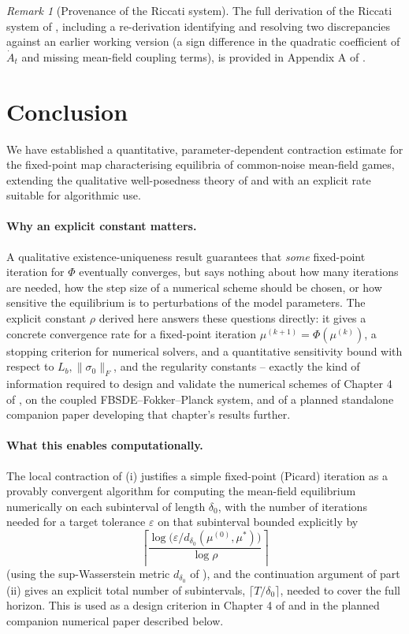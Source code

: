 \documentclass[11pt]{article}
\theoremstyle{remark}
\newtheorem{remark}[theorem]{Remark}
\begin{document}
\begin{remark}[Provenance of the Riccati system]
\label{rem:lq-provenance}
The full derivation of the Riccati system of , including a
re-derivation identifying and resolving two discrepancies against an earlier
working version (a sign difference in the quadratic coefficient of $\dot A_t$ and
missing mean-field coupling terms), is provided in Appendix A of
\citet{monyimba2026thesis}.
\end{remark}

\section{Conclusion}

We have established a quantitative, parameter-dependent contraction estimate for the
fixed-point map characterising equilibria of common-noise mean-field games, extending
the qualitative well-posedness theory of \citet{carmonadelarue2018} and
\citet{ahujarenyang2019} with an explicit rate suitable for algorithmic use.

\paragraph{Why an explicit constant matters.} A qualitative existence-uniqueness
result guarantees that \emph{some} fixed-point iteration for $\Phi$ eventually
converges, but says nothing about how many iterations are needed, how the step size
of a numerical scheme should be chosen, or how sensitive the equilibrium is to
perturbations of the model parameters. The explicit constant $\rho$ derived here
answers these questions directly: it gives a concrete convergence rate for a
fixed-point iteration $\mu^{(k+1)} = \Phi(\mu^{(k)})$, a stopping criterion for
numerical solvers, and a quantitative sensitivity bound with respect to
$L_b, \|\sigma_0\|_F$, and the regularity constants -- exactly the kind of
information required to design and validate the numerical schemes of Chapter 4 of
\citet{monyimba2026thesis}, on the coupled FBSDE--Fokker--Planck system, and of a
planned standalone companion paper developing that chapter's results further.

\paragraph{What this enables computationally.} The local contraction of
(i) justifies a simple fixed-point (Picard) iteration as a
provably convergent algorithm for computing the mean-field equilibrium numerically
on each subinterval of length $\delta_0$, with the number of iterations needed for
a target tolerance $\varepsilon$ on that subinterval bounded explicitly by
\[
    \left\lceil \frac{\log\big(\varepsilon/d_{\delta_0}(\mu^{(0)},\mu^{*})\big)}
    {\log\rho} \right\rceil
\]
(using
the sup-Wasserstein metric $d_{\delta_0}$ of ), and the
continuation argument of part (ii) gives an explicit total number of subintervals,
$\lceil T/\delta_0\rceil$, needed to cover the full horizon. This is used as a
design criterion in Chapter 4 of \citet{monyimba2026thesis} and in the planned
companion numerical paper described below.
\end{document}
